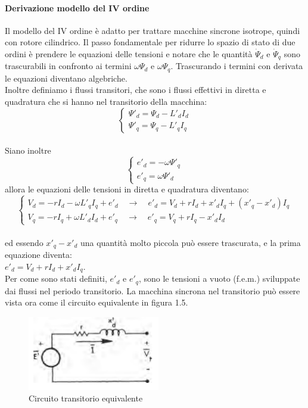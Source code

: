 \documentclass[Lau,noexaminfo]{sapthesis}
\begin{document}
	
	
	\paragraph{Derivazione modello del IV ordine}
	Il modello del IV ordine è adatto per trattare macchine sincrone isotrope, quindi con rotore cilindrico. Il passo fondamentale per ridurre lo spazio di stato di due ordini è prendere le equazioni delle tensioni e notare che le quantità $\dot{\Psi}_d$ e $\dot{\Psi}_q$ sono trascurabili in confronto ai termini $\omega\Psi_d$ e $\omega\Psi_q$.
	Trascurando i termini con derivata le equazioni diventano algebriche.\\
	Inoltre definiamo i flussi transitori, che sono i flussi effettivi in diretta e quadratura che si hanno nel transitorio della macchina:\\
	\[
	\begin{cases}
	\Psi'_d=\Psi_d-L'_dI_d\\
	\Psi'_q=\Psi_q-L'_qI_q
	\end{cases}
	\]\\
	Siano inoltre 
	\[
	\begin{cases}
	e'_d=-\omega\Psi'_q\\
	e'_q=\omega\Psi'_d
	\end{cases}
	\]
	allora le equazioni delle tensioni in diretta e quadratura diventano:\\
	\[
	\begin{cases}
	V_d=-rI_d-\omega L'_qI_q+e'_d \quad \rightarrow \quad e'_d=V_d+rI_d+x'_dI_q+(x'_q-x'_d)I_q\\
	V_q=-rI_q+\omega L'_dI_d+e'_q \quad\rightarrow \quad e'_q=V_q+rI_q-x'_dI_d
	\end{cases}
	\]\\
	ed essendo $x'_q-x'_d$ una quantità molto piccola può essere trascurata, e la prima equazione diventa:\\
	$e'_d=V_d+rI_d+x'_dI_q$.\\
	Per come sono stati definiti, $e'_d$ e $e'_q$, sono le tensioni a vuoto (f.e.m.) sviluppate dai flussi nel periodo transitorio. La macchina sincrona nel transitorio può essere vista ora come il circuito equivalente in figura 1.5.
	\begin{figure}
		\centering
		\includegraphics[height=0.1\textheight]{circuito_equiv_IV}
		\caption{Circuito transitorio equivalente }
	\end{figure}
\end{document}
